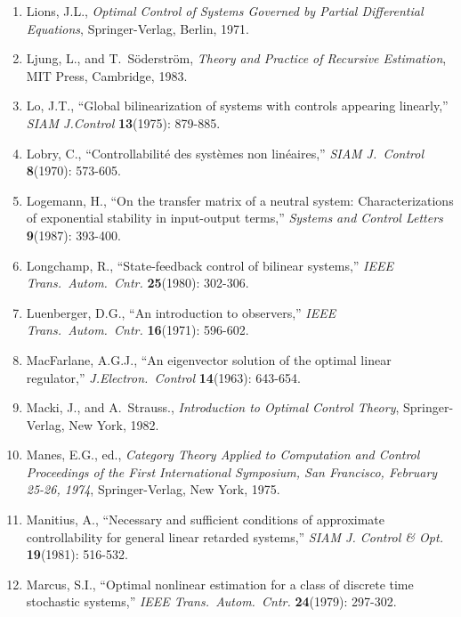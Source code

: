 \begin{enumerate}
\item
Lions, J.L., {\it Optimal Control of Systems Governed by Partial Differential
Equations}, Springer-Verlag, Berlin, 1971.

\item
Ljung, L., and T.\ S\"oderstr\"om, {\it Theory and Practice of Recursive
Estimation}, MIT Press, Cambridge, 1983.

\item
Lo, J.T., ``Global bilinearization of systems with controls appearing
linearly,'' {\it SIAM J.Control} {\bf 13}(1975): 879-885.

\item
Lobry, C., ``Controllabilit\'e des syst\`emes non lin\'eaires,'' {\it SIAM J.\
Control} {\bf 8}(1970): 573-605.

\item
Logemann, H., ``On the transfer matrix of a neutral system: Characterizations
of exponential stability in input-output terms,'' {\it Systems and Control
Letters} {\bf 9}(1987): 393-400.

\item
Longchamp, R., ``State-feedback control of bilinear systems,'' {\it IEEE
Trans.\ Autom.\ Cntr.} {\bf 25}(1980): 302-306.

\item
Luenberger, D.G., ``An introduction to observers,'' {\it IEEE Trans.\ Autom.\
Cntr.} {\bf 16}(1971): 596-602.

\item
MacFarlane, A.G.J., ``An eigenvector solution of the optimal linear
regulator,'' {\it J.Electron.\ Control} {\bf 14}(1963): 643-654.

\item
Macki, J., and A.\ Strauss., {\it Introduction to Optimal Control Theory},
Springer-Verlag, New York, 1982.

\item
Manes, E.G., ed., {\it Category Theory Applied to Computation and Control
Proceedings of the First International Symposium, San Francisco, February
25-26, 1974}, Springer-Verlag, New York, 1975.

\item
Manitius, A., ``Necessary and sufficient conditions of approximate
controllability for general linear retarded systems,'' {\it SIAM J.  Control
\& Opt.\/} {\bf 19}(1981): 516-532.

\item
Marcus, S.I., ``Optimal nonlinear estimation for a class of discrete time
stochastic systems,'' {\it IEEE Trans.\ Autom.\ Cntr.} {\bf 24}(1979):
297-302.


\end{enumerate}
